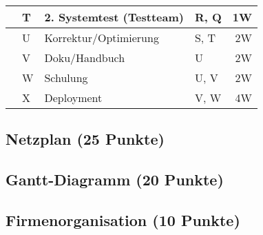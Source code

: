 \documentclass{scrartcl}
\begin{document}
\begin{center}
\begin{tabular}{l:lllr}
      &T & 2. Systemtest (Testteam) & R, Q & 1W \\
      \midrule
      &U & Korrektur/Optimierung & S, T & 2W \\
      &V & Doku/Handbuch & U & 2W \\
      &W & Schulung & U, V & 2W \\
      &X & Deployment &  V, W & 4W\\
      \bottomrule
   \end{tabular}
\end{center}
\subsection{Netzplan (25 Punkte)}
\subsection{Gantt-Diagramm (20 Punkte)}
\subsection{Firmenorganisation (10 Punkte)}
\end{document}
